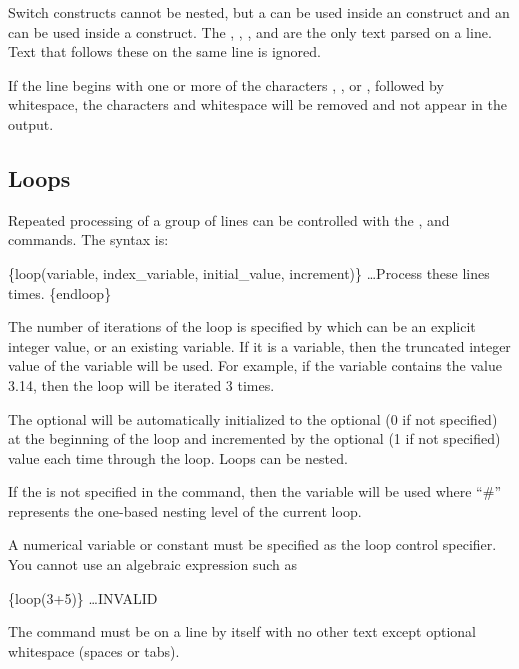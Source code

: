 Switch constructs cannot be nested, but a  can be used inside an  construct and an  can be used inside a  construct.
The , , , and  are the only text parsed on a line. Text that follows these on the same line is
ignored.

If the line begins with one or more of the characters \cmd{\#}, \cmd{\$}, or \cmd{//}, followed by whitespace, the characters and whitespace will be removed and not appear in the output.

\subsection{Loops} Repeated processing of a group of lines can be controlled
with the , and  commands. The syntax is:
\begin{apinp}
\{loop(variable, index\_variable, initial\_value, increment)\}
\ldots Process these lines  times.  
\{endloop\}
\end{apinp}

The number of iterations of the loop is specified by  which can be an explicit integer value, or an existing variable.  If it is a variable, then the truncated integer value of the variable will be used.  For example, if the variable contains the value 3.14, then the loop will be iterated 3 times.

The optional  will be automatically initialized
to the optional  (0 if not specified) at the
beginning of the loop and incremented by the optional 
(1 if not specified) value each time through the loop.  Loops can be
nested.

If the  is not specified in the 
command, then the variable  will be used where ``\#''
represents the one-based nesting level of the current loop.

A numerical variable or constant must be specified as the loop control
specifier. You cannot use an algebraic expression such as

\begin{apinp}
\{loop(3+5)\}  \ldots INVALID
\end{apinp}

The  command must be on a line by itself with no other text except optional whitespace (spaces or tabs).

